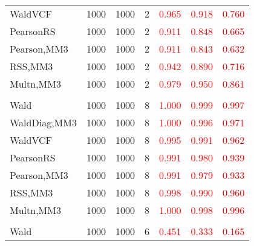 \documentclass[
]{article}
\begin{document}
\begin{table}[H]
{\begin{tabular}[t]{lrrrrrr}
\hspace{1em}WaldVCF & 1000 & 1000 & 2 & \textcolor{red}{0.965} & \textcolor{red}{0.918} & \textcolor{red}{0.760}\\
\hspace{1em}PearsonRS & 1000 & 1000 & 2 & \textcolor{red}{0.911} & \textcolor{red}{0.848} & \textcolor{red}{0.665}\\
\hspace{1em}Pearson,MM3 & 1000 & 1000 & 2 & \textcolor{red}{0.911} & \textcolor{red}{0.843} & \textcolor{red}{0.632}\\
\hspace{1em}RSS,MM3 & 1000 & 1000 & 2 & \textcolor{red}{0.942} & \textcolor{red}{0.890} & \textcolor{red}{0.716}\\
\hspace{1em}Multn,MM3 & 1000 & 1000 & 2 & \textcolor{red}{0.979} & \textcolor{red}{0.950} & \textcolor{red}{0.861}\\
\addlinespace[0.3em]
\multicolumn{7}{l}{\textbf{1F 15V}}\\
\hspace{1em}Wald & 1000 & 1000 & 8 & \textcolor{red}{1.000} & \textcolor{red}{0.999} & \textcolor{red}{0.997}\\
\hspace{1em}WaldDiag,MM3 & 1000 & 1000 & 8 & \textcolor{red}{1.000} & \textcolor{red}{0.996} & \textcolor{red}{0.971}\\
\hspace{1em}WaldVCF & 1000 & 1000 & 8 & \textcolor{red}{0.995} & \textcolor{red}{0.991} & \textcolor{red}{0.962}\\
\hspace{1em}PearsonRS & 1000 & 1000 & 8 & \textcolor{red}{0.991} & \textcolor{red}{0.980} & \textcolor{red}{0.939}\\
\hspace{1em}Pearson,MM3 & 1000 & 1000 & 8 & \textcolor{red}{0.991} & \textcolor{red}{0.979} & \textcolor{red}{0.933}\\
\hspace{1em}RSS,MM3 & 1000 & 1000 & 8 & \textcolor{red}{0.998} & \textcolor{red}{0.990} & \textcolor{red}{0.960}\\
\hspace{1em}Multn,MM3 & 1000 & 1000 & 8 & \textcolor{red}{1.000} & \textcolor{red}{0.998} & \textcolor{red}{0.996}\\
\addlinespace[0.3em]
\multicolumn{7}{l}{\textbf{2F 10V}}\\
\hspace{1em}Wald & 1000 & 1000 & 6 & \textcolor{red}{0.451} & \textcolor{red}{0.333} & \textcolor{red}{0.165}\\

\end{tabular}}
\end{table}
\end{document}
